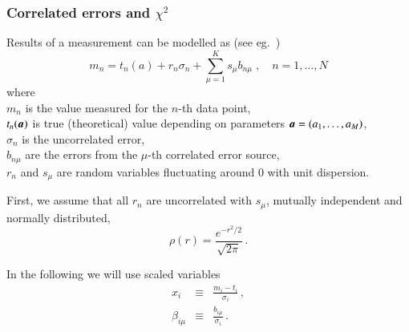 

\newcommand{\rs}{s}
\newcommand{\ce}{b}
\DeclareRobustCommand\Vstat{\ensuremath{V^{\mathrm{(unc)}}}}
\DeclareRobustCommand\Vsys{\ensuremath{V^{\mathrm{(cor)}}}}
\DeclareRobustCommand\mb[1]{\ensuremath{\mbox{\mathversion{bold}{$#1$}}}}
\DeclareRobustCommand\mbs[1]{\ensuremath{\mbox{\mathversion{bold}{\scriptsize $#1$}}}}

\subsubsection {Correlated errors and \texorpdfstring{$\chi^2$}{chi2}}
\label{sec:cor-chi2}

Results of a measurement can be modelled as
(see eg.~\cite{Stump:2001gu,Botje:2001fx})
\begin{equation}
m_n = t_n(a) + r_n \sigma_n + \sum_{\mu=1}^K \rs_\mu \ce_{n\mu}
\;,\quad n=1,\dots,N
\end{equation}
where\\
$m_n$ is the value measured for the $n$-th data point,\\
$t_n(\mb a)$ is true (theoretical) value depending on parameters $\mb a = (a_1,\dots, a_M)$,\\
$\sigma_n$ is the uncorrelated error,\\
$\ce_{n\mu}$ are the errors from the $\mu$-th correlated error source,\\
$r_n$ and $\rs_\mu$ are random variables fluctuating around 0 with unit dispersion.

First, we assume that all $r_n$ are uncorrelated with $\rs_\mu$,
mutually independent and normally distributed,
\begin{equation}
\rho(r) = \frac{e^{-r^2/2}}{\sqrt{2\pi}}
\,.
\end{equation}

In the following we will use scaled variables
\begin{subequations}
\begin{eqnarray}
x_i &\equiv& \frac{m_i-t_i}{\sigma_i}
\,,
\\
\beta_{i\mu} &\equiv& \frac{\ce_{i\mu}}{\sigma_i}
\,.
\end{eqnarray}
\end{subequations}

